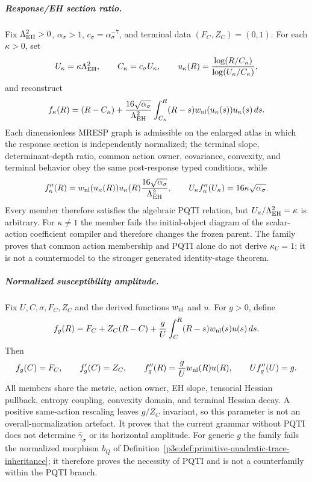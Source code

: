 \documentclass[11pt,a4paper]{article}
\begin{document}
\subparagraph{Response/EH section ratio.}
Fix \(\Lambda_{\rm EH}^2>0\), \(\alpha_\sigma>1\),
\(c_\sigma=\alpha_\sigma^{-7}\), and terminal data \((F_C,Z_C)=(0,1)\).
For each \(\kappa>0\), set
\[
 U_\kappa=\kappa\Lambda_{\rm EH}^2,
 \qquad C_\kappa=c_\sigma U_\kappa,
 \qquad
 u_\kappa(R)=\frac{\log(R/C_\kappa)}{\log(U_\kappa/C_\kappa)},
\]
and reconstruct
\[
 f_\kappa(R)
 =(R-C_\kappa)
 +\frac{16\sqrt{\alpha_\sigma}}{\Lambda_{\rm EH}^2}
  \int_{C_\kappa}^{R}(R-s)w_{\rm nl}(u_\kappa(s))u_\kappa(s)\,ds.
\]
Each dimensionless MRESP graph is admissible on the enlarged atlas in which
the response section is independently normalized; the terminal slope,
determinant-depth ratio, common action owner, covariance, convexity, and
terminal behavior obey the same post-response typed conditions, while
\[
 f_\kappa''(R)
 =w_{\rm nl}(u_\kappa(R))u_\kappa(R)
  \frac{16\sqrt{\alpha_\sigma}}{\Lambda_{\rm EH}^2},
 \qquad
 U_\kappa f_\kappa''(U_\kappa)
 =16\kappa\sqrt{\alpha_\sigma}.
\]
Every member therefore satisfies the algebraic PQTI relation, but
\(U_\kappa/\Lambda_{\rm EH}^2=\kappa\) is arbitrary.  For
\(\kappa\ne1\) the member fails the initial-object diagram of the
scalar-action coefficient compiler and therefore changes the frozen parent.
The family proves that common action membership and PQTI alone do not derive
\(\kappa_U=1\); it is not a countermodel to the stronger generated
identity-stage theorem.

\subparagraph{Normalized susceptibility amplitude.}
Fix \(U,C,\sigma,F_C,Z_C\) and the derived functions
\(w_{\rm nl}\) and \(u\).  For \(g>0\), define
\[
 f_g(R)=F_C+Z_C(R-C)
 +\frac gU\int_C^R(R-s)w_{\rm nl}(s)u(s)\,ds.
\]
Then
\[
 f_g(C)=F_C,
 \qquad f_g'(C)=Z_C,
 \qquad f_g''(R)=\frac gU w_{\rm nl}(R)u(R),
 \qquad Uf_g''(U)=g.
\]
All members share the metric, action owner, EH slope, tensorial Hessian
pullback, entropy coupling, convexity domain, and terminal Hessian decay.  A
positive same-action rescaling leaves \(g/Z_C\) invariant, so this parameter
is not an overall-normalization artefact.  It proves that the current grammar
without PQTI does not determine \(\widehat\gamma_\sigma\) or its horizontal
amplitude.  For generic \(g\) the family fails the normalized morphism
\(b_Q\) of Definition~\ref{p3e:def:primitive-quadratic-trace-inheritance};
it therefore proves the necessity of PQTI and is not a counterfamily within
the PQTI branch.
\end{document}
